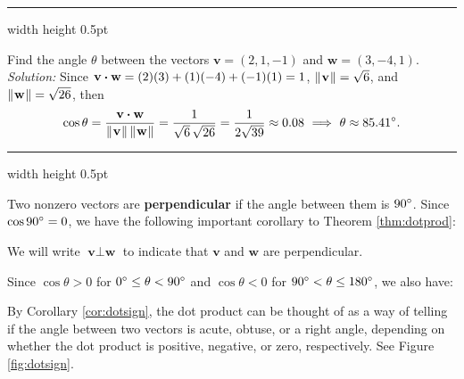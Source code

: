 \hrule width \textwidth height 0.5pt
\begin{exmp}
 Find the angle $\theta$ between the vectors $\textbf{v} = (2,1,-1)$ and $\textbf{w} =
 (3,-4,1)$.\vspace{2mm}\\\emph{Solution:}
 Since $\textbf{v} \bm{\cdot} \textbf{w} = (2)(3) + (1)(-4) + (-1)(1) = 1$,
 $\lVert\mspace{1mu}\textbf{v}\mspace{1mu}\rVert = \sqrt{6}$, and $\lVert\mspace{1mu}\textbf{w}\mspace{1mu}\rVert = \sqrt{26}$, then
 \begin{displaymath}
  \cos \theta = \frac{\textbf{v} \bm{\cdot} \textbf{w}}{\lVert\mspace{1mu}\textbf{v}\mspace{1mu}\rVert \, \lVert\mspace{1mu}\textbf{w}\mspace{1mu}\rVert} =
  \frac{1}{\sqrt{6}\,\sqrt{26}} = \frac{1}{2 \sqrt{39}} \approx 0.08 ~ \Longrightarrow ~ \theta \approx 85.41^\circ.
 \end{displaymath}
\end{exmp}
\hrule width \textwidth height 0.5pt
\vspace{2mm}

Two nonzero vectors are \textbf{perpendicular} if the angle between them is $90^\circ$.
Since $\cos 90^\circ = 0$, we have the following important corollary to Theorem \ref{thm:dotprod}:

We will write $\textbf{v} \perp \textbf{w}$ to indicate that $\textbf{v}$ and $\textbf{w}$ are perpendicular.

Since $\cos \theta > 0$ for $0^\circ \le \theta < 90^\circ$ and $\cos \theta < 0$ for
$90^\circ < \theta \le 180^\circ$, we also have:


By Corollary \ref{cor:dotsign}, the dot product can be thought of as a way of telling if the angle between two vectors
is acute, obtuse, or a right angle, depending on whether the dot product is positive, negative, or zero,
respectively. See Figure \ref{fig:dotsign}.

